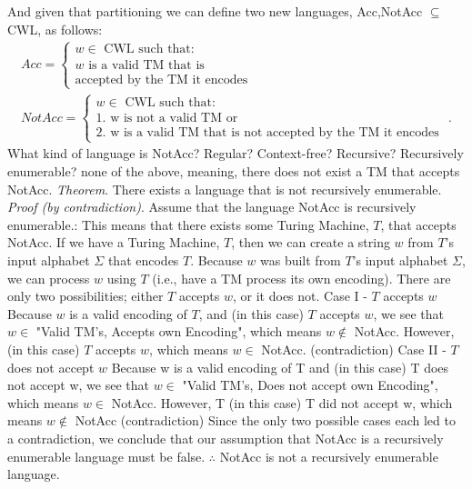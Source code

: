 \documentclass{report}
\begin{document}
\begin{itemize}
\begin{itemize}
            \end{itemize}
            \bigbreak \noindent 
            And given that partitioning we can define two new languages, Acc,NotAcc $\subseteq$ CWL, as follows:
            \begin{align*}
               Acc = 
               \begin{cases}
                   w \in \text{ CWL such that: } \\
                   w \text{ is a valid TM that is } \\
                   \text{accepted by the TM it encodes}
               \end{cases} \\
               NotAcc = 
               \begin{cases}
                   w \in \text{ CWL such that: } \\
                   \text{1. w is not a valid TM or} \\
                   \text{2. w is a valid TM that is not accepted by the TM it encodes }
               \end{cases}
            .\end{align*}
            What kind of language is NotAcc? Regular? Context-free? Recursive? Recursively enumerable? none of the above, meaning, there does not exist a TM that accepts NotAcc.
            \bigbreak \noindent 
            \textit{Theorem}. There exists a language that is not recursively enumerable.
\bigbreak \noindent 
\textit{Proof (by contradiction)}. Assume that the language NotAcc is recursively enumerable.:
\bigbreak \noindent 
{}
\bigbreak \noindent 
This means that there exists some Turing Machine, $T$, that accepts NotAcc.
\bigbreak \noindent If we have a Turing Machine, $T$, then we can create a string $w$ from $T$'s input alphabet $\Sigma$ that encodes $T$. Because $w$ was built from $T$'s input alphabet $\Sigma$, we can process $w$ using $T$ (i.e., have a TM process its own encoding).
\bigbreak \noindent There are only two possibilities; either $T$ accepts $w$, or it does not.
\bigbreak \noindent 
Case I - $T$ accepts $w$
\bigbreak \noindent 
Because $w$ is a valid encoding of $T$, and (in this case) $T$ accepts $w$, we see that $w \in$ "Valid TM's, Accepts own Encoding",
which means $w \not\in $ NotAcc. However, (in this case) $T$ accepts $w$, which means $w \in$ NotAcc. (contradiction)
\bigbreak \noindent 
Case II - $T$ does not accept $w$
\bigbreak \noindent 
Because w is a valid encoding of T and (in this case) T does not accept w, we see
that $w \in$ "Valid TM's, Does not accept own Encoding", which means $w \in$ NotAcc.
\bigbreak \noindent 
However, T (in this case) T did not accept w,
which means $w \not\in$ NotAcc (contradiction)
\bigbreak \noindent 
Since the only two possible cases each led to a contradiction, we
conclude that our assumption that NotAcc is a recursively
enumerable language must be false.
\bigbreak \noindent 
$\therefore$ NotAcc is not a recursively enumerable language.



    \end{itemize}
\end{document}
